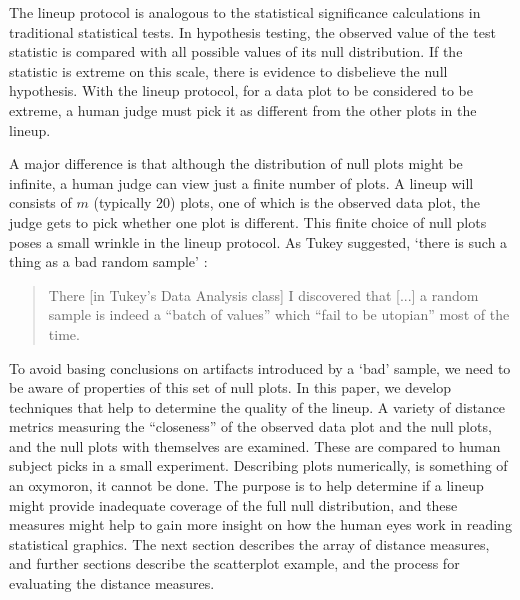 \documentclass[12]{report}
\begin{document}
The lineup protocol is analogous to the statistical significance calculations in traditional statistical tests. In hypothesis testing, the observed value of the test statistic is compared with all possible values of its null distribution. If the statistic is extreme on this scale, there is evidence to disbelieve the null hypothesis. With the lineup protocol, for a data plot to be considered to be extreme, a human judge must pick it as different from the other plots in the lineup. 

A major difference is that although the distribution of null plots might be infinite, a human judge can view just a finite number of plots. A lineup will consists of $m$ (typically 20) plots, one of which is the observed data plot, the judge gets to pick whether one plot is different. This finite choice of null plots poses a small wrinkle in the lineup protocol. As Tukey suggested, `there is such a thing as a bad random sample' \citep{fernholz03}:

\begin{quotation}
There [in Tukey's Data Analysis class] I discovered that [...]  a random sample is indeed a ``batch of values'' which ``fail to be utopian'' most of the time.
\end{quotation}

To avoid basing conclusions on artifacts introduced by a `bad' sample, we need to be aware of properties of this set of null plots. In this paper, we develop techniques that help to determine the quality of the lineup. A variety of distance metrics measuring the ``closeness'' of the observed data plot and the null plots, and the null plots with themselves are examined. These are compared to human subject picks in a small experiment.  Describing plots numerically, is something  of an oxymoron, it cannot be done. The purpose is to help determine if a lineup might provide inadequate coverage of the full null distribution, and these measures might help to gain more insight on how the human eyes work in reading statistical graphics. The next section describes the array of distance measures, and further sections describe the scatterplot example, and the process for evaluating the distance measures. 

\end{document}

